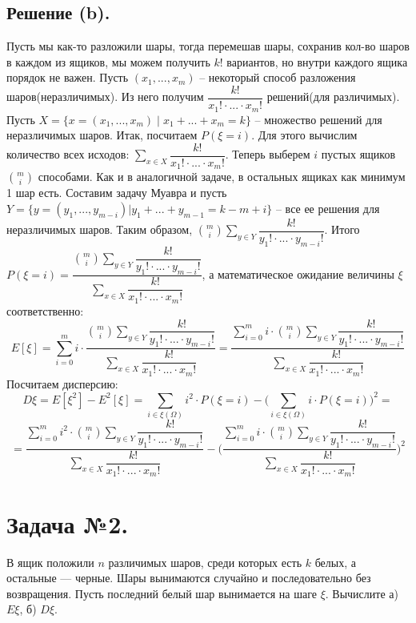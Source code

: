 \documentclass[a4paper, 12pt]{article}
\newcommand{\D}{\displaystyle}
\begin{document}
\begin{spacing}{1}
\subsection{Решение (b).} Пусть мы как-то разложили шары, тогда перемешав шары, сохранив кол-во шаров в каждом из ящиков, мы можем получить $k!$ вариантов, но внутри каждого ящика порядок не важен. Пусть $(x_1, ...,x_m)$ -- некоторый способ разложения шаров(неразличимых). Из него получим $\dfrac{k!}{x_1!\cdot...\cdot x_m!}$ решений(для различимых). Пусть $X = \{x = (x_1,...,x_m)\;|\;x_1+...+x_m=k\}$ -- множество решений для неразличимых шаров. Итак, посчитаем $P(\xi=i)$. Для этого вычислим количество всех исходов: $\D \sum\limits_{x \in X}\dfrac{k!}{x_1!\cdot...\cdot x_m!}$. Теперь выберем $i$ пустых ящиков $\binom{m}{i}$ способами. Как и в аналогичной задаче, в остальных ящиках как минимум 1 шар есть. Составим задачу Муавра и пусть $Y = \{y=(y_1,...,y_{m-i})|y_1+...+y_{m-1} = k - m + i\}$ -- все ее решения для неразличимых шаров. Таким образом, $\binom{m}{i}\sum\limits_{y\in Y}\dfrac{k!}{y_1!\cdot...\cdot y_{m - i}!}$. Итого $\D P(\xi=i) = \dfrac{\binom{m}{i}\sum\limits_{y\in Y}\dfrac{k!}{y_1!\cdot...\cdot y_{m - i}!}}{\sum\limits_{x \in X}\dfrac{k!}{x_1!\cdot...\cdot x_m!}}$, а математическое ожидание величины $\xi$ соответственно:
$$
E[\xi] = \sum\limits_{i = 0}^{m} i\cdot \dfrac{\binom{m}{i}\sum\limits_{y\in Y}\dfrac{k!}{y_1!\cdot...\cdot y_{m - i}!}}{\sum\limits_{x \in X}\dfrac{k!}{x_1!\cdot...\cdot x_m!}} = \dfrac{\sum\limits_{i = 0}^{m} i\cdot \binom{m}{i}\sum\limits_{y\in Y}\dfrac{k!}{y_1!\cdot...\cdot y_{m - i}!}}{\sum\limits_{x \in X}\dfrac{k!}{x_1!\cdot...\cdot x_m!}} 
$$
Посчитаем дисперсию:
$$
D\xi = E[\xi^2] - E^2[\xi] = \sum\limits_{i \in \xi(\Omega)} i^2 \cdot P(\xi = i) - \Big(\sum\limits_{i \in \xi(\Omega)} i \cdot P(\xi = i)\Big)^2 = 
$$
$$
=\dfrac{\sum\limits_{i = 0}^{m} i^2\cdot \binom{m}{i}\sum\limits_{y\in Y}\dfrac{k!}{y_1!\cdot...\cdot y_{m - i}!}}{\sum\limits_{x \in X}\dfrac{k!}{x_1!\cdot...\cdot x_m!}} - \Bigg(\dfrac{\sum\limits_{i = 0}^{m} i\cdot \binom{m}{i}\sum\limits_{y\in Y}\dfrac{k!}{y_1!\cdot...\cdot y_{m - i}!}}{\sum\limits_{x \in X}\dfrac{k!}{x_1!\cdot...\cdot x_m!}}\Bigg)^2
$$
\section{Задача №2.}
В ящик положили $n$ различимых шаров, среди которых есть $k$ белых,
а остальные — черные. Шары вынимаются случайно и последовательно
без возвращения. Пусть последний белый шар вынимается на шаге $\xi$.
Вычислите а) $E\xi$, б) $D\xi$.

\end{spacing}
\end{document}
